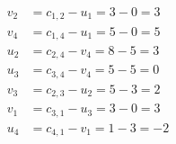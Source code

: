 \[
\begin{aligned}
v_{2} &= c_{1,2} - u_{1} = 3 - 0 = 3 \\
v_{4} &= c_{1,4} - u_{1} = 5 - 0 = 5 \\
u_{2} &= c_{2,4} - v_{4} = 8 - 5 = 3 \\
u_{3} &= c_{3,4} - v_{4} = 5 - 5 = 0 \\
v_{3} &= c_{2,3} - u_{2} = 5 - 3 = 2 \\
v_{1} &= c_{3,1} - u_{3} = 3 - 0 = 3 \\
u_{4} &= c_{4,1} - v_{1} = 1 - 3 = -2 \\
\end{aligned}
\]

